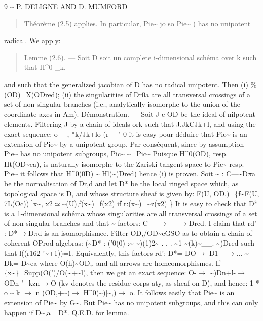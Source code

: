 \documentclass[11pt]{article}
\theoremstyle{plain}
\theoremstyle{definition}
\theoremstyle{remark}
\begin{document}
9 \textasciitilde{} P. DELIGNE AND D. MUMFORD

\begin{quote}Th\'eor\`eme (2.5) applies. In particular, Pie\textasciitilde{} jo so Pie\textasciitilde{} ) has no unipotent\end{quote}
radical. We apply:

\begin{quote}Lemme (2.6). --- Soit D soit un complete i-dimensional sch\'ema over k such that H\textasciicircum{}0 \_k,\end{quote}
and such that the generalized jacobian of D has no radical unipotent. Then (i) \%(OD)=X(ODred); (ii) the singularities of Dr0a are all transversal crossings of a set of non-singular branches (i.e., analytically isomorphe to the union of the coordinate axes in Am). D\'emonstration. --- Soit J c OD be the ideal of nilpotent elements. Filtering J by a chain of ideals ork such that J.JkCJk+l, and using the exact sequence: o ---, *k/Jk+lo (r ---" 0 it is easy pour d\'eduire that Pie\textasciitilde{} is an extension of Pie\textasciitilde{} by a unipotent group. Par cons\'equent, since by assumption Pie\textasciitilde{} has no unipotent subgroups, Pic\textasciitilde{} \textasciitilde{}=Pic\textasciitilde{} Puisque H\textasciicircum{}0(OD), resp. Ht(OD\textasciitilde{}ea), is naturally isomorphe to the Zariski tangent space to Pic\textasciitilde{} resp. Pie\textasciitilde{} it follows that H\textasciicircum{}0(0D) \textasciitilde{} Hl(\textasciitilde{})Dred) hence (i) is proven. Soit \textasciitilde{} : C---\textasciitilde{}D$\pi$a be the normalisation of Dr,d and let D* be the local ringed space which, as topological space is D, and whose structure sheaf is given by: F(U, OD.)=\{f\textasciitilde{}F(U, 7L(Oc)) ]x\textasciitilde{}, x2$\simeq$\textasciitilde{}(U),f(x\textasciitilde{})=f(x2) if r:(x\textasciitilde{})=\textasciitilde{}z(x2) \} It is easy to check that D* is a 1-dimensional sch\'ema whose singularities are all transversal crossings of a set of non-singular branches and that \textasciitilde{} factors: C ---$\to$ ---$\to$Dred. I claim that rd' : D*$\to$D$\pi$d is an isomorphismee. Filter OD,/OD\textasciitilde{}eGSO as to obtain a chain of coherent OProd-algebras: (\textasciitilde{}D* : ('0(0) :\textasciitilde{} \textasciitilde{})(1)2\textasciitilde{} . . . \textasciitilde{}1 \textasciitilde{}(k)\textasciitilde{}\_\_. \textasciitilde{})Dred such that l((r162 '\textasciitilde{}+1))=I. Equivalently, this factors rd': D*= DO$\to$ D1---$\to$... \textasciitilde{} Dk= D\textasciitilde{}ea where O(h)\textasciitilde{}OD,, and all arrows are homeomorphismes. If \{x\textasciitilde{}\}=Supp(O(')/O(\textasciitilde{}+\textasciitilde{}l), then we get an exact sequence: O-$\to$ \textasciitilde{})Dn+l-$\to$ ODn-'+kzn$\to$O (kv denotes the residue corps aty, as sheaf on D), and hence: 1 * o \textasciitilde{} k $\to$ n (OD,+\textasciitilde{})$\to$ H\textasciicircum{}0(\textasciitilde{})]\textasciitilde{},)$\to$ o. It follows easily that Pie\textasciitilde{} is an extension of Pie\textasciitilde{} by G\textasciitilde{}. But Pie\textasciitilde{} has no unipotent subgroups, and this can only happen if D\textasciitilde{},a= D*. Q.E.D. for lemma.
\end{document}
